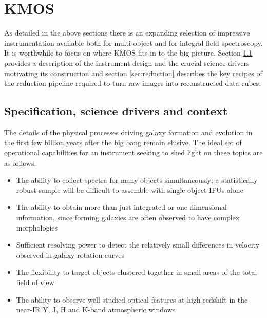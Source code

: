 \documentclass{literature}
\begin{document}
\section{KMOS}\label{sec:KMOS}
As detailed in the above sections there is an expanding selection of impressive instrumentation available both for multi-object and for integral field spectroscopy. It is worthwhile to focus on where KMOS fits in to the big picture. Section \ref{subsec:instrument} provides a description of the instrument design and the crucial science drivers motivating its construction and section \ref{sec:reduction} describes the key recipes of the reduction pipeline required to turn raw images into reconstructed data cubes. 

\subsection{Specification, science drivers and context}\label{subsec:instrument}
The details of the physical processes driving galaxy formation and evolution in the first few billion years after the big bang remain elusive. The ideal set of operational capabilities for an instrument seeking to shed light on these topics are as follows. 
\begin{itemize}
	\item The ability to collect spectra for many objects simultaneously; a statistically robust sample will be difficult to assemble with single object IFUs alone 
	\item The ability to obtain more than just integrated or one dimensional information, since forming galaxies are often observed to have complex morphologies 
	\item Sufficient resolving power to detect the relatively small differences in velocity observed in galaxy rotation curves
	\item The flexibility to target objects clustered together in small areas of the total field of view 
	\item The ability to observe well studied optical features at high redshift in the near-IR Y, J, H and K-band atmospheric windows    
\end{itemize}
\end{document}
